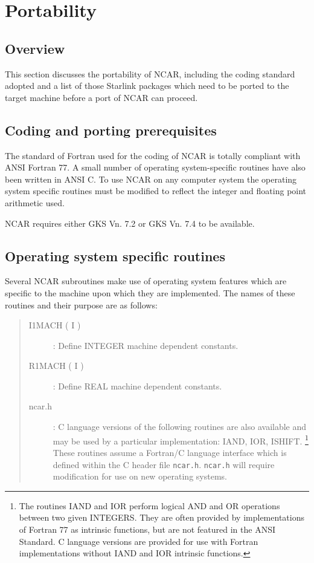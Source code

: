 \documentclass[twoside,11pt,nolof,noabs]{starlink}
\begin{document}
\newpage

\section{Portability}

\subsection{Overview}

This section discusses the portability of NCAR, including the coding 
standard adopted and a list of those Starlink packages which 
need to be ported to the target machine before a port of NCAR can proceed.


\subsection{Coding and porting prerequisites}

The standard of Fortran used for the coding of NCAR is totally
compliant with ANSI Fortran 77.
A small number of operating system-specific routines have also been written
in ANSI C.
To use NCAR on any computer system the operating system specific routines
must be modified to reflect the integer and floating point arithmetic used.

NCAR requires either GKS Vn. 7.2 or GKS Vn. 7.4 to be available.


\subsection{Operating system specific routines}

Several NCAR subroutines make use of operating system features which are
specific to the machine upon which they are implemented.
The names of these routines and their purpose are as follows:

\begin {quote}
\begin {description}
\item [I1MACH ( I )]:
Define INTEGER machine dependent constants.

\item [R1MACH ( I )]:
Define REAL machine dependent constants.

\item [ncar.h]:
C language versions of the following routines are also available
and may be used by a particular implementation: IAND, IOR, ISHIFT.
\footnote{The routines IAND and IOR
perform logical AND and OR operations between two given INTEGERS. 
They are  often provided by implementations of Fortran 77 as intrinsic
functions, but are not featured in the ANSI Standard.
C language versions are provided for use with Fortran implementations without
IAND and IOR intrinsic functions.}
These routines assume a Fortran/C language interface which is defined
within the C header file \texttt{ncar.h}.
\texttt{ncar.h} will require modification for use on new operating systems.

\end {description}
\end {quote}

\end{document}
